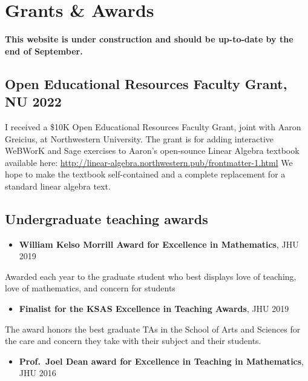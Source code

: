 \documentclass[
]{report}
\providecommand{\tightlist}{%
  \setlength{\itemsep}{0pt}\setlength{\parskip}{0pt}}
\begin{document}
\hypertarget{grants-awards}{%
\chapter{Grants \& Awards}\label{grants-awards}}

\textbf{This website is under construction and should be up-to-date by the end of September.}

\hypertarget{open-educational-resources-faculty-grant-nu-2022}{%
\section{Open Educational Resources Faculty Grant, NU 2022}\label{open-educational-resources-faculty-grant-nu-2022}}

I received a \$10K Open Educational Resources Faculty Grant, joint with Aaron Greicius, at Northwestern University.
The grant is for adding interactive WeBWorK and Sage exercises to Aaron's open-sounce Linear Algebra textbook available here: \url{http://linear-algebra.northwestern.pub/frontmatter-1.html}
We hope to make the textbook self-contained and a complete replacement for a standard linear algebra text.

\hypertarget{undergraduate-teaching-awards}{%
\section{Undergraduate teaching awards}\label{undergraduate-teaching-awards}}

\begin{itemize}
\tightlist
\item
  \textbf{William Kelso Morrill Award for Excellence in Mathematics}, JHU 2019
\end{itemize}

Awarded each year to the graduate student who best displays love of teaching, love of mathematics, and concern for students

\begin{itemize}
\tightlist
\item
  \textbf{Finalist for the KSAS Excellence in Teaching Awards}, JHU 2019
\end{itemize}

The award honors the best graduate TAs in the School of Arts and Sciences for the care and concern they take with their subject and their students.

\begin{itemize}
\tightlist
\item
  \textbf{Prof.~Joel Dean award for Excellence in Teaching in Mathematics}, JHU 2016
\end{itemize}
\end{document}
